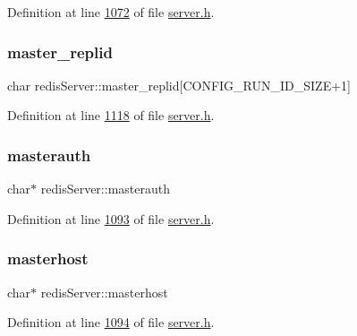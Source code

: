 Definition at line \hyperlink{server_8h_source_l01072}{1072} of file \hyperlink{server_8h_source}{server.\+h}.

\mbox{\label{structredisServer_a445b8a6f8cde5f9030b8432fa86a7ade}} 
\subsubsection{\texorpdfstring{master\+\_\+replid}{master\_replid}}
{\footnotesize\ttfamily char redis\+Server\+::master\+\_\+replid\mbox{[}C\+O\+N\+F\+I\+G\+\_\+\+R\+U\+N\+\_\+\+I\+D\+\_\+\+S\+I\+ZE+1\mbox{]}}



Definition at line \hyperlink{server_8h_source_l01118}{1118} of file \hyperlink{server_8h_source}{server.\+h}.

\mbox{\label{structredisServer_a273d4ceddb4a17d4e06d2e4584e0b30f}} 
\subsubsection{\texorpdfstring{masterauth}{masterauth}}
{\footnotesize\ttfamily char$\ast$ redis\+Server\+::masterauth}



Definition at line \hyperlink{server_8h_source_l01093}{1093} of file \hyperlink{server_8h_source}{server.\+h}.

\mbox{\label{structredisServer_ab65b401eea5be7e6fcdd7ecc3bf21626}} 
\subsubsection{\texorpdfstring{masterhost}{masterhost}}
{\footnotesize\ttfamily char$\ast$ redis\+Server\+::masterhost}



Definition at line \hyperlink{server_8h_source_l01094}{1094} of file \hyperlink{server_8h_source}{server.\+h}.

\mbox{\label{structredisServer_a2f487d267bf6c548d533f7a2add7e7f5}} 
